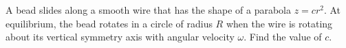 \documentclass[../main.tex]{subfiles}
\begin{document}
\begin{problema}
	A bead slides along a smooth wire that has the shape of a parabola
	\(z = cr^{2}\). At equilibrium, the bead rotates in a circle of radius \(R\)
	when the wire is rotating about its vertical symmetry axis with angular velocity
	\(\omega\). Find the value of \(c\).
\end{problema}
\end{document}
